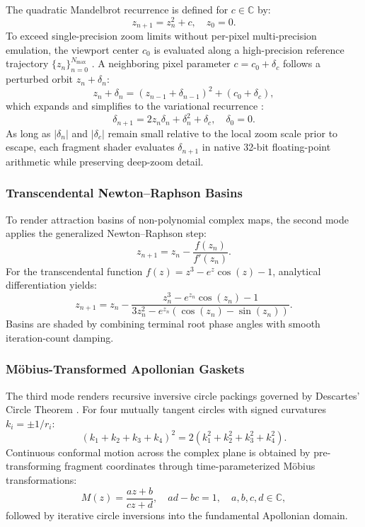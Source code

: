 \documentclass[11pt, a4paper]{article}
\begin{document}
The quadratic Mandelbrot recurrence is defined for $c \in \mathbb{C}$ by:
\begin{equation}
  z_{n+1} = z_n^2 + c, \quad z_0 = 0.
\end{equation}
To exceed single-precision zoom limits without per-pixel multi-precision emulation, the viewport center $c_0$ is evaluated along a high-precision reference trajectory $\{z_n\}_{n=0}^{N_{\max}}$ \cite{martin2013superfractalthing}. A neighboring pixel parameter $c = c_0 + \delta_c$ follows a perturbed orbit $z_n + \delta_n$:
\begin{equation}
  z_n + \delta_n = (z_{n-1} + \delta_{n-1})^2 + (c_0 + \delta_c),
\end{equation}
which expands and simplifies to the variational recurrence \cite{martin2013superfractalthing, quilezfractal}:
\begin{equation}
  \delta_{n+1} = 2 z_n \delta_n + \delta_n^2 + \delta_c, \quad \delta_0 = 0.
\end{equation}
As long as $|\delta_n|$ and $|\delta_c|$ remain small relative to the local zoom scale prior to escape, each fragment shader evaluates $\delta_{n+1}$ in native 32-bit floating-point arithmetic while preserving deep-zoom detail.

\subsubsection{Transcendental Newton--Raphson Basins}

To render attraction basins of non-polynomial complex maps, the second mode applies the generalized Newton--Raphson step:
\begin{equation}
  z_{n+1} = z_n - \frac{f(z_n)}{f'(z_n)}.
\end{equation}
For the transcendental function $f(z) = z^3 - e^z \cos(z) - 1$, analytical differentiation yields:
\begin{equation}
  z_{n+1} = z_n - \frac{z_n^3 - e^{z_n}\cos(z_n) - 1}{3z_n^2 - e^{z_n}(\cos(z_n) - \sin(z_n))}.
\end{equation}
Basins are shaded by combining terminal root phase angles with smooth iteration-count damping.

\subsubsection{M\"obius-Transformed Apollonian Gaskets}

The third mode renders recursive inversive circle packings governed by Descartes' Circle Theorem \cite{lagarias2002descartes}. For four mutually tangent circles with signed curvatures $k_i = \pm 1/r_i$:
\begin{equation}
  (k_1 + k_2 + k_3 + k_4)^2 = 2(k_1^2 + k_2^2 + k_3^2 + k_4^2).
\end{equation}
Continuous conformal motion across the complex plane is obtained by pre-transforming fragment coordinates through time-parameterized M\"obius transformations:
\begin{equation}
  M(z) = \frac{az + b}{cz + d}, \quad ad - bc = 1, \quad a,b,c,d \in \mathbb{C},
\end{equation}
followed by iterative circle inversions into the fundamental Apollonian domain.
\end{document}
